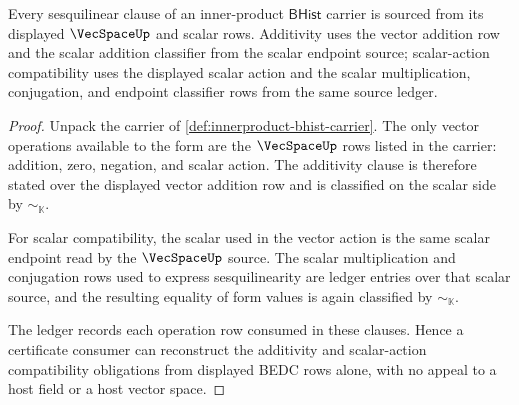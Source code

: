 \begin{theorem}
\label{thm:innerproduct-sesquilinear-source-obligation}
Every sesquilinear clause of an inner-product $\mathsf{BHist}$ carrier is
sourced from its displayed $\VecSpaceUp$ and scalar rows. Additivity uses the
vector addition row and the scalar addition classifier from the scalar
endpoint source; scalar-action compatibility uses the displayed scalar action
and the scalar multiplication, conjugation, and endpoint classifier rows from
the same source ledger.
\end{theorem}
\begin{proof}
Unpack the carrier of \autoref{def:innerproduct-bhist-carrier}. The only
vector operations available to the form are the $\VecSpaceUp$ rows listed in
the carrier: addition, zero, negation, and scalar action. The additivity
clause is therefore stated over the displayed vector addition row and is
classified on the scalar side by $\sim_{\mathbb{K}}$.

For scalar compatibility, the scalar used in the vector action is the same
scalar endpoint read by the $\VecSpaceUp$ source. The scalar multiplication
and conjugation rows used to express sesquilinearity are ledger entries over
that scalar source, and the resulting equality of form values is again
classified by $\sim_{\mathbb{K}}$.

The ledger records each operation row consumed in these clauses. Hence a
certificate consumer can reconstruct the additivity and scalar-action
compatibility obligations from displayed BEDC rows alone, with no appeal to a
host field or a host vector space.
\end{proof}

